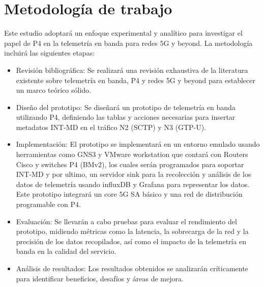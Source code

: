 \section{Metodología de trabajo}
Este estudio adoptará un enfoque experimental y analítico para investigar el papel de P4 en la telemetría en banda para redes 5G y beyond. La metodología incluirá las siguientes etapas:
\begin{itemize}
    \item Revisión bibliográfica: Se realizará una revisión exhaustiva de la literatura existente sobre telemetría en banda, P4 y redes 5G y beyond para establecer un marco teórico sólido.
    \item Diseño del prototipo: Se diseñará un prototipo de telemetría en banda utilizando P4, definiendo las tablas y acciones necesarias para insertar metadatos INT-MD en el tráfico N2 (SCTP) y N3 (GTP-U).
    \item Implementación: El prototipo se implementará en un entorno emulado usando herramientas como GNS3 y VMware workstation que contará con Routers Cisco y switches P4 (BMv2), los cuales serán programados para soportar INT-MD y por ultimo, un servidor sink para la recolección y análisis de los datos de telemetría usando influxDB y Grafana para representar los datos. Este prototipo integrará un core 5G SA básico y una red de distribución programable con P4.
    \item Evaluación: Se llevarán a cabo pruebas para evaluar el rendimiento del prototipo, midiendo métricas como la latencia, la sobrecarga de la red y la precisión de los datos recopilados, así como el impacto de la telemetría en banda en la calidad del servicio.
    \item Análisis de resultados: Los resultados obtenidos se analizarán críticamente para identificar beneficios, desafíos y áreas de mejora.
\end{itemize}
